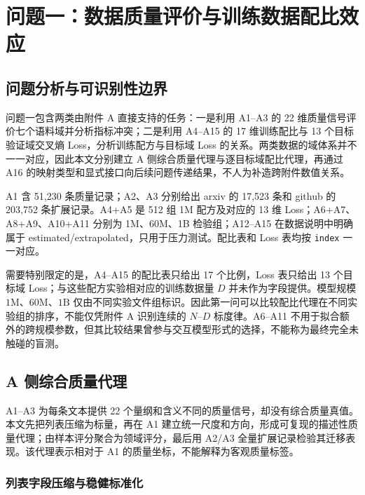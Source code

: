 \section{问题一：数据质量评价与训练数据配比效应}
\label{sec:q1}

\subsection{问题分析与可识别性边界}

问题一包含两类由附件 A 直接支持的任务：一是利用 A1--A3 的 22 维质量信号评价七个语料域并分析指标冲突；二是利用 A4--A15 的 17 维训练配比与 13 个目标验证域交叉熵 Loss，分析训练配方与目标域 Loss 的关系。两类数据的域体系并不一一对应，因此本文分别建立 A 侧综合质量代理与逐目标域配比代理，再通过 A16 的映射类型和显式接口向后续问题传递结果，不人为补造跨附件数值关系。

A1 含 51,230 条质量记录；A2、A3 分别给出 arxiv 的 17,523 条和 github 的 203,752 条扩展记录。A4+A5 是 512 组 1M 配方及对应的 13 维 Loss；A6+A7、A8+A9、A10+A11 分别为 1M、60M、1B 检验组；A12--A15 在数据说明中明确属于 estimated/extrapolated，只用于压力测试。配比表和 Loss 表均按 \texttt{index} 一一对应。

需要特别限定的是，A4--A15 的配比表只给出 17 个比例，Loss 表只给出 13 个目标域 Loss；与这些配方实验相对应的训练数据量 $D$ 并未作为字段提供。模型规模 $1\mathrm{M}$、$60\mathrm{M}$、$1\mathrm{B}$ 仅由不同实验文件组标识。因此第一问可以比较配比代理在不同实验组的排序，不能仅凭附件 A 识别连续的 $N$--$D$ 标度律。A6--A11 不用于拟合额外的跨规模参数，但其比较结果曾参与交互模型形式的选择，不能称为最终完全未触碰的盲测。

\subsection{A 侧综合质量代理}

A1--A3 为每条文本提供 22 个量纲和含义不同的质量信号，却没有综合质量真值。本文先把列表压缩为标量，再在 A1 建立统一尺度和方向，形成可复现的描述性质量代理；由样本评分聚合为领域评分，最后用 A2/A3 全量扩展记录检验其迁移表现。该代理表示相对于 A1 的质量坐标，不能解释为客观质量标签。

\subsubsection{列表字段压缩与稳健标准化}

